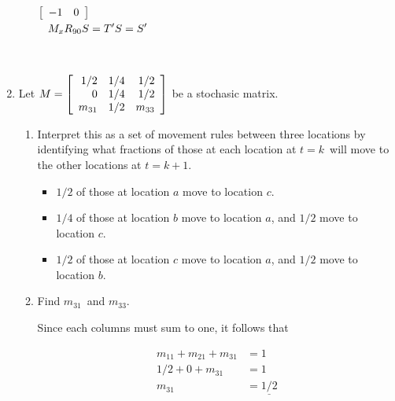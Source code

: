 \documentclass{letter}
\newcommand{\?}{\stackrel{?}{=}}
\newcommand\Que[1]{%
   \leavevmode\noindent
   #1
}
\newcommand\Ans[2][]{%
   \leavevmode\noindent
   {
       \begin{mdframed}[backgroundcolor=blue!10]
       #2
       \end{mdframed}
   }
}
\newenvironment{salign}
 {\par$\!\aligned}
 {\endaligned$\par}
\newenvironment{Mat}[1]{%
  \left[\begin{array}{*{#1}{r}}
}{%
  \end{array}\right]
}
\begin{document}
\begin{enumerate}
\begin{enumerate}[label=(\alph*)]
{\begin{minipage}[m]{0.6\textwidth}
\begin{salign}
\begin{Mat}{2}
               -1 & 0
             \end{Mat}\\
             M_xR_{90}S &=T'S=S'
            \end{salign}
          \end{minipage}
    }
    \end{enumerate}
    ~\\
    \item Let 
        $M= \begin{Mat}{3}
            1/2 & 1/4 & 1/2 \\
            0   & 1/4 & 1/2 \\
            m_{31} & 1/2 & m_{33}
            \end{Mat}$
         be a stochasic matrix.  
    \begin{enumerate}[label=(\alph*)]        
    \item \Que{
        Interpret this as a set of movement rules between three locations by identifying what fractions of those at each location at $t=k$\ will move to the other locations at $t=k+1$.
    }
    \Ans{
      \begin{itemize}
        \item $1/2$ of those at location $a$ move to location $c$.
        \item $1/4$ of those at location $b$ move to location $a$, and $1/2$ move to location $c$.
        \item $1/2$ of those at location $c$ move to location $a$, and $1/2$ move to location $b$. 
      \end{itemize}
    }
    \item \Que{
        Find $m_{31}$\ and $m_{33}$.
    }
    \Ans{
      Since each columns must sum to one, it follows that \\
      \begin{minipage}[m]{0.4\textwidth}
      
      \begin{align*}
      m_{11}+m_{21}+m_{31}&=1 \\
      1/2+0+m_{31}        &=1\\
      m_{31}              &=\underline{1/2}
      \end{align*}
      \end{minipage}
      \begin{minipage}[m]{0.4\textwidth}
      

\end{minipage}}
\end{enumerate}
\end{enumerate}
\end{document}
